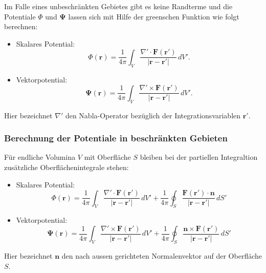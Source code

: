Im Falle eines unbeschränkten Gebietes gibt es keine Randterme und
die Potentiale $\Phi$ und $\boldsymbol{\Psi}$ lassen sich mit Hilfe
der greenschen Funktion wie folgt berechnen:
\begin{itemize}
\item Skalares Potential:
\begin{equation}
\Phi(\boldsymbol{r})
=
\frac{1}{4 \pi}
\int_{V}
\frac{\nabla' \cdot \boldsymbol{F}(\boldsymbol{r}')}{|\boldsymbol{r} - \boldsymbol{r}'|}
\,dV'.
\end{equation}

\item Vektorpotential:
\begin{equation}
\boldsymbol{\Psi}(\boldsymbol{r})
=
\frac{1}{4 \pi}
\int_{V}
\frac{\nabla' \times \boldsymbol{F}(\boldsymbol{r}')}{|\boldsymbol{r} - \boldsymbol{r}'|}
\,dV'.
\end{equation}
\end{itemize}
Hier bezeichnet $\nabla'$ den Nabla-Operator bezüglich der
Integrationsvariablen $\boldsymbol{r}'$.

\subsubsection{Berechnung der Potentiale in beschränkten Gebieten}
Für endliche Volumina $V$ mit Oberfläche $S$ bleiben bei der partiellen
Integraltion zusätzliche Oberflächenintegrale stehen:
\begin{itemize}
\item Skalares Potential:
\begin{equation}
\Phi (\boldsymbol{r})
=
\frac{1}{4\pi}
\int_V
\frac{\nabla' \cdot \boldsymbol{F}(\boldsymbol{r}')}{|\boldsymbol{r} - \boldsymbol{r}'|}
\,dV'
+
\frac{1}{4\pi}
\oint_S \frac{\boldsymbol{F}(\boldsymbol{r}') \cdot \boldsymbol{n}}{|\boldsymbol{r} - \boldsymbol{r}'|}
\,dS'
\end{equation}

\item Vektorpotential:
\begin{equation}
\boldsymbol{\Psi}(\boldsymbol{r})
=
\frac{1}{4\pi}
\int_V
\frac{\nabla' \times \boldsymbol{F}(\boldsymbol{r}')}{|\boldsymbol{r} - \boldsymbol{r}'|}
\,dV'
+
\frac{1}{4\pi}
\oint_S
\frac{\boldsymbol{n} \times \boldsymbol{F}(\boldsymbol{r}')}{|\boldsymbol{r} - \boldsymbol{r}'|}
\,dS'
\end{equation}
\end{itemize}
Hier bezeichnet $\boldsymbol{n}$ den nach aussen gerichteten
Normalenvektor auf der Oberfläche $S$.

